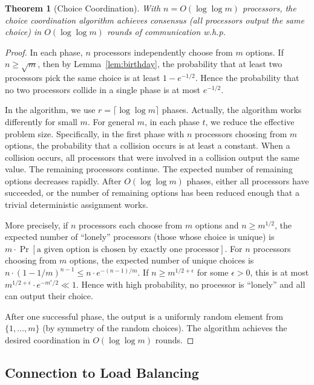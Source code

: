 \documentclass[twoside,12pt]{book}
\theoremstyle{plain}
\newtheorem{theorem}{Theorem}[chapter]
\theoremstyle{definition}
\theoremstyle{remark}
\begin{document}
\begin{theorem}[Choice Coordination]
\label{thm:choice}
With $n = O(\log \log m)$ processors, the choice coordination algorithm achieves consensus (all processors output the same choice) in $O(\log \log m)$ rounds of communication w.h.p.
\end{theorem}

\begin{proof}
In each phase, $n$ processors independently choose from $m$ options. If $n \geq \sqrt{m}$, then by Lemma~\ref{lem:birthday}, the probability that at least two processors pick the same choice is at least $1 - e^{-1/2}$. Hence the probability that no two processors collide in a single phase is at most $e^{-1/2}$. 

In the algorithm, we use $r = \lceil \log \log m \rceil$ phases. Actually, the algorithm works differently for small $m$. For general $m$, in each phase $t$, we reduce the effective problem size. Specifically, in the first phase with $n$ processors choosing from $m$ options, the probability that a collision occurs is at least a constant. When a collision occurs, all processors that were involved in a collision output the same value. The remaining processors continue. The expected number of remaining options decreases rapidly. After $O(\log \log m)$ phases, either all processors have succeeded, or the number of remaining options has been reduced enough that a trivial deterministic assignment works.

More precisely, if $n$ processors each choose from $m$ options and $n \geq m^{1/2}$, the expected number of ``lonely'' processors (those whose choice is unique) is $m \cdot \Pr[\text{a given option is chosen by exactly one processor}]$. For $n$ processors choosing from $m$ options, the expected number of unique choices is $n \cdot (1 - 1/m)^{n-1} \leq n \cdot e^{-(n-1)/m}$. If $n \geq m^{1/2+\epsilon}$ for some $\epsilon > 0$, this is at most $m^{1/2+\epsilon} \cdot e^{-m^{\epsilon}/2} \ll 1$. Hence with high probability, no processor is ``lonely'' and all can output their choice.

After one successful phase, the output is a uniformly random element from $\{1, \ldots, m\}$ (by symmetry of the random choices). The algorithm achieves the desired coordination in $O(\log \log m)$ rounds.
\end{proof}

\subsection{Connection to Load Balancing}
\label{subsec:choice-load-balancing}
\end{document}

